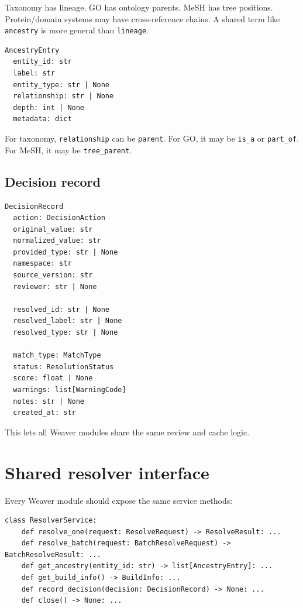 \documentclass[11pt,a4paper]{article}
\newcommand{\code}[1]{\texttt{#1}}
\begin{document}
Taxonomy has lineage. GO has ontology parents. MeSH has tree positions. Protein/domain systems may have cross-reference chains. A shared term like \code{ancestry} is more general than \code{lineage}.

\begin{Verbatim}[fontsize=\small]
AncestryEntry
  entity_id: str
  label: str
  entity_type: str | None
  relationship: str | None
  depth: int | None
  metadata: dict
\end{Verbatim}

For taxonomy, \code{relationship} can be \code{parent}. For GO, it may be \code{is_a} or \code{part_of}. For MeSH, it may be \code{tree_parent}.

\subsection{Decision record}

\begin{Verbatim}[fontsize=\small]
DecisionRecord
  action: DecisionAction
  original_value: str
  normalized_value: str
  provided_type: str | None
  namespace: str
  source_version: str
  reviewer: str | None

  resolved_id: str | None
  resolved_label: str | None
  resolved_type: str | None

  match_type: MatchType
  status: ResolutionStatus
  score: float | None
  warnings: list[WarningCode]
  notes: str | None
  created_at: str
\end{Verbatim}

This lets all Weaver modules share the same review and cache logic.

\section{Shared resolver interface}

Every Weaver module should expose the same service methods:

\begin{Verbatim}[fontsize=\small]
class ResolverService:
    def resolve_one(request: ResolveRequest) -> ResolveResult: ...
    def resolve_batch(request: BatchResolveRequest) -> BatchResolveResult: ...
    def get_ancestry(entity_id: str) -> list[AncestryEntry]: ...
    def get_build_info() -> BuildInfo: ...
    def record_decision(decision: DecisionRecord) -> None: ...
    def close() -> None: ...
\end{Verbatim}
\end{document}
